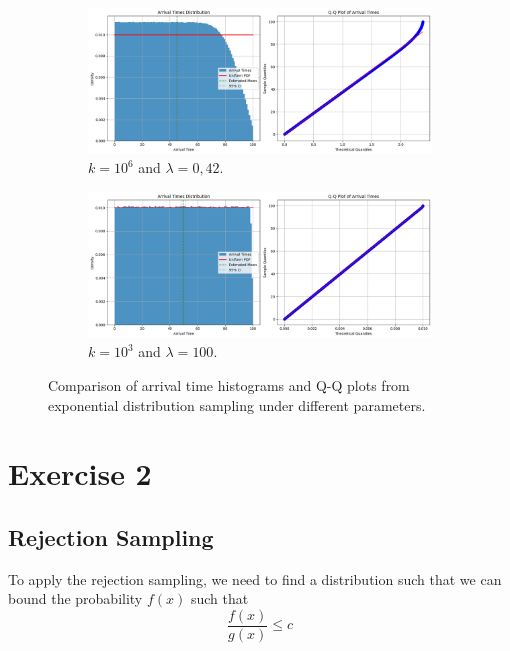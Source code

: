 \documentclass[a4paper,12pt]{article}
\begin{document}
\begin{figure}[htbp]
  \centering
  \begin{subfigure}[b]{0.48\textwidth}
    \centering
    \includegraphics[width=\textwidth]{images/ex1-p2.png}
    \caption{$k = 10^6$ and $\lambda = 0,42$.}\label{fig:ex1-p2}
  \end{subfigure}
  \hfill
  \begin{subfigure}[b]{0.48\textwidth}
    \centering
    \includegraphics[width=\textwidth]{images/ex1-p2-hl.png}
    \caption{$k = 10^3$ and $\lambda = 100$.}\label{fig:ex1-p2-hl}
  \end{subfigure}
  \caption{Comparison of arrival time histograms and Q-Q plots from exponential distribution sampling under different parameters.}\label{fig:ex1-p2-combined}
\end{figure}

\section*{Exercise 2}

\subsection*{Rejection Sampling}
To apply the rejection sampling, we need to find a distribution such that we can bound the probability $f(x)$ such that
\begin{equation*}
  \frac{f(x)}{g(x)} \leq c
\end{equation*}
\end{document}
